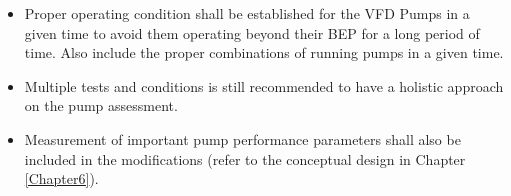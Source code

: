 \begin{itemize}
\item	Proper operating condition shall be established for the VFD Pumps in a given time to avoid them operating beyond their BEP for a long period of time. Also include the proper combinations of running pumps in a given time.
\item	Multiple tests and conditions is still recommended to have a holistic approach on the pump assessment.
\item	Measurement of important pump performance parameters shall also be included in the modifications (refer to the conceptual design in Chapter \ref{Chapter6}).
\end{itemize}


